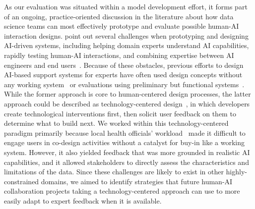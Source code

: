 As our evaluation was situated within a model development effort, it forms part of an ongoing, practice-oriented discussion in the literature about how data science teams can most effectively prototype and evaluate possible human-AI interaction designs.
\citeauthor{yang_re-examining_2020} point out several challenges when prototyping and designing AI-driven systems, including helping domain experts understand AI capabilities, rapidly testing human-AI interactions, and combining expertise between AI engineers and end users~\cite{yang_re-examining_2020}. 
Because of these obstacles, previous efforts to design AI-based support systems for experts have often used design concepts without any working system~\cite{yildirim_sketching_2024,Kawakami2022} or evaluations using preliminary but functional systems~\cite{gu_lessons_2020,Cai2019,Sivaraman2023}.
While the former approach is core to human-centered design processes, the latter approach could be described as technology-centered design~\cite{yang_re-examining_2020,bly_design_1999,ries_lean_2011}, in which developers create technological interventions first, then solicit user feedback on them to determine what to build next.
We worked within this technology-centered paradigm primarily because local health officials' workload~\cite{brownson_building_2018,leider_state_2020} made it difficult to engage users in co-design activities without a catalyst for buy-in like a working system. 
However, it also yielded feedback that was more grounded in realistic AI capabilities, and it allowed stakeholders to directly assess the characteristics and limitations of the data.
Since these challenges are likely to exist in other highly-constrained domains, we aimed to identify strategies that future human-AI collaboration projects taking a technology-centered approach can use to more easily adapt to expert feedback when it is available.